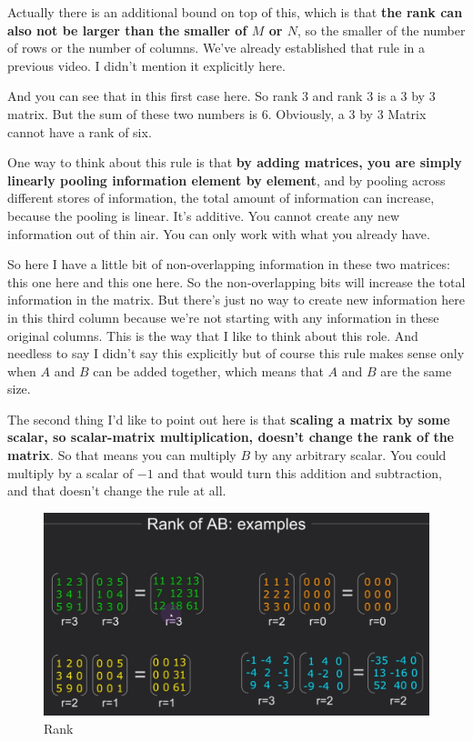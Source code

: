\documentclass[fleqn,10pt]{olplainarticle}
\theoremstyle{definition}
\theoremstyle{remark}
\begin{document}
Actually there is an additional bound on top of this, which is that \textbf{the rank can also not be larger than the smaller of $M$ or $N$}, so the smaller of the number of rows or the number of columns. We've already established that rule in a previous video. I didn't mention it explicitly here. 

And you can see that in this first case here. So rank 3 and rank 3 is a 3 by 3 matrix. But the sum of these two numbers is 6. Obviously, a 3 by 3 Matrix cannot have a rank of six. 

One way to think about this rule is that \textbf{by adding matrices, you are simply linearly pooling information element by element}, and by pooling across different stores of information, the total amount of information can increase, because the pooling is linear. It's additive. You cannot create any new information out of thin air. You can only work with what you already have.

So here I have a little bit of non-overlapping information in these two matrices: this one here and this one here. So the non-overlapping bits will increase the total information in the matrix. But there's just no way to create new information here in this third column because we're not starting with any information in these original columns. This is the way that I like to think about this role. And needless to say I didn't say this explicitly but of course this rule makes sense only when $A$ and $B$ can be added together, which means that $A$ and $B$ are the same size.

The second thing I'd like to point out here is that \textbf{scaling a matrix by some scalar, so scalar-matrix multiplication, doesn't change the rank of the matrix}. So that means you can multiply $B$ by any arbitrary scalar. You could multiply by a scalar of $-1$ and that would turn this addition and subtraction, and that doesn't change the rule at all.

\begin{figure}[ht]
	\centering
	\includegraphics[width=0.5\linewidth]{images/rank-20.png}
	\caption{Rank}
	\label{fig:rank_20}
\end{figure}
\end{document}
